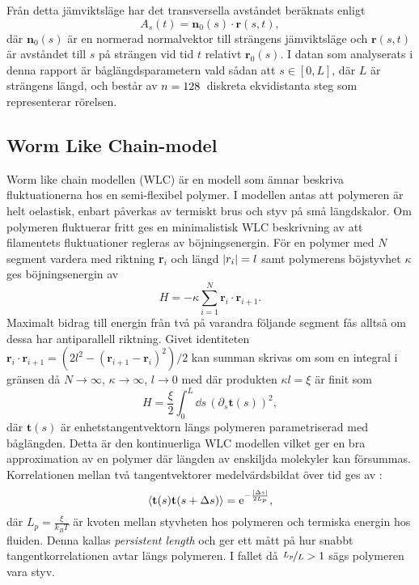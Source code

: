 Från detta jämviktsläge har det transversella avståndet beräknats enligt 
\begin{equation}
A_s(t) = \mathbf{n}_0(s)\cdot\mathbf{r}(s,t),
\end{equation}
där $\mathbf{n}_0(s)$ är en normerad normalvektor till strängens jämviktsläge och $\mathbf{r}(s,t)$ är avståndet till $s$ på strängen vid tid $t$ relativt $\mathbf{r}_0(s)$. I datan som analyserats i denna rapport är båglängdsparametern vald sådan att $s\in[0,L]$, där $L$ är strängens längd, och består av $n=\unit[128]{}$ diskreta ekvidistanta steg som representerar rörelsen.

\subsection{Worm Like Chain-model}

Worm like chain modellen \cite{Milstein2013} (WLC) är en modell som ämnar beskriva fluktuationerna hos en semi-flexibel polymer. I modellen antas att polymeren är helt oelastisk, enbart påverkas av termiskt brus och styv på små längdskalor. Om polymeren fluktuerar fritt %
ges en minimalistisk WLC beskrivning av att filamentets fluktuationer regleras av böjningsenergin. För en polymer med $N$ segment vardera med riktning \textbf{r}$_i$ och längd $\abs{r_{i}}=l$ samt polymerens böjstyvhet $\kappa$ ges böjningsenergin av
\begin{equation}
    H = -\kappa\sum_{i=1}^{N}\textbf{r}_{i}\cdot \textbf{r}_{i+1}.
\end{equation}
Maximalt bidrag till energin från två på varandra följande segment fås alltså om dessa har antiparallell riktning. Givet identiteten $\textbf{r}_{i}\cdot\textbf{r}_{i+1}=(2l^2-(\textbf{r}_{i+1}-\textbf{r}_{i})^2)/2$ kan summan skrivas om som en integral i gränsen då $N \to \infty$, $\kappa\to\infty$, $l \to 0$ med där produkten $\kappa l=\xi$ är finit som
\begin{equation}\label{böj}
    H=\frac{\xi}{2}\int_{0}^{L}\!\dd{s}\,(\partial_{s}\textbf{t}(s))^2,
\end{equation}
där $\textbf{t}(s)$ är enhetstangentvektorn längs polymeren parametriserad med båglängden. Detta är den kontinuerliga WLC modellen \cite{Fixman_WLC1973} vilket ger en bra approximation av en polymer där längden av enskiljda molekyler kan försummas.  Korrelationen mellan två tangentvektorer medelvärdsbildat över tid ges av \cite{Landau1958}:
\begin{equation}
\ev{\textbf{t}(s)\textbf{t}(s+\Delta s)}=\ee^{-\frac{\abs{\Delta s}}{2L_{p}}},
\end{equation}
där $L_{p}=\frac{\xi}{k_{B}T}$ är kvoten mellan styvheten hos polymeren och termiska energin hos fluiden. Denna kallas \emph{persistent length} och ger ett mått på hur snabbt tangentkorrelationen avtar längs polymeren. I fallet då $\nicefrac{L_{p}}{L}>1$ sägs polymeren vara styv. 

